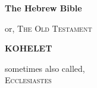 \documentclass[a4paper,11pt,doublespaced]{report}
\begin{document}
\begin{titlepage}
    \begin{center}
        \vspace*{1cm}
 
        {\Huge  \textbf{The Hebrew Bible}}
 
        \vspace{0.5cm}
        {or, \textsc{The Old Testament}}
        
                   
        \vspace{1.5cm}
        
        {\large \textbf{KOHELET}}

        \vspace{1.5cm}

        \vspace{0.5cm}
        {sometimes also called,\\
        \textsc{Ecclesiastes}}

        \vspace{0.5cm}

        \vfill
    \end{center}
 \end{titlepage}

\tableofcontents



% 
\end{document}
